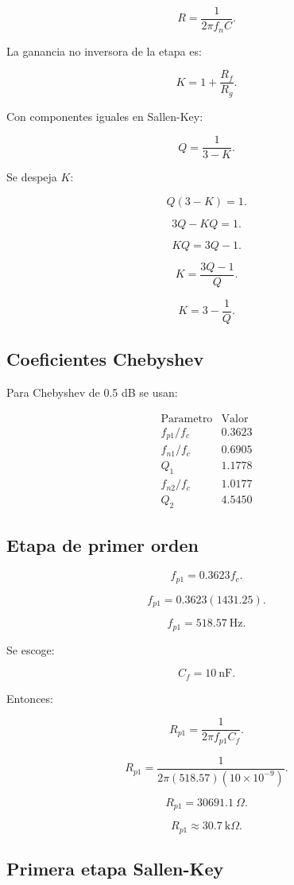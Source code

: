 \documentclass[11pt,letterpaper]{article}
\begin{document}
\[
R=\frac{1}{2\pi f_n C}.
\]

La ganancia no inversora de la etapa es:

\[
K=1+\frac{R_f}{R_g}.
\]

Con componentes iguales en Sallen-Key:

\[
Q=\frac{1}{3-K}.
\]

Se despeja \(K\):

\[
Q(3-K)=1.
\]

\[
3Q-KQ=1.
\]

\[
KQ=3Q-1.
\]

\[
K=\frac{3Q-1}{Q}.
\]

\[
K=3-\frac{1}{Q}.
\]

\subsection{Coeficientes Chebyshev}

Para Chebyshev de 0.5 dB se usan:

\[
\begin{array}{c|c}
\text{Parametro} & \text{Valor} \\
\hline
f_{p1}/f_c & 0.3623\\
f_{n1}/f_c & 0.6905\\
Q_1 & 1.1778\\
f_{n2}/f_c & 1.0177\\
Q_2 & 4.5450
\end{array}
\]

\subsection{Etapa de primer orden}

\[
f_{p1}=0.3623f_c.
\]

\[
f_{p1}=0.3623(1431.25).
\]

\[
f_{p1}=518.57~\text{Hz}.
\]

Se escoge:

\[
C_f=10~\text{nF}.
\]

Entonces:

\[
R_{p1}=
\frac{1}{2\pi f_{p1}C_f}.
\]

\[
R_{p1}=
\frac{1}
{2\pi(518.57)(10\times 10^{-9})}.
\]

\[
R_{p1}=30691.1~\Omega.
\]

\[
\boxed{R_{p1}\approx 30.7~\text{k}\Omega}.
\]

\subsection{Primera etapa Sallen-Key}
\end{document}
